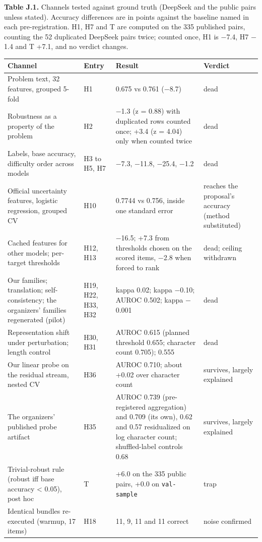 \begin{center}\begin{minipage}{\linewidth}
\noindent\textbf{Table J.1.} Channels tested against ground truth (DeepSeek and the public pairs unless stated). Accuracy differences are in points against the baseline named in each pre-registration. H1, H7 and T are computed on the 335 published pairs, counting the 52 duplicated DeepSeek pairs twice; counted once, H1 is $-$7.4, H7 $-$1.4 and T +7.1, and no verdict changes.\par\smallskip
{\footnotesize\setlength{\tabcolsep}{4pt}
\begin{tabular}{L{3.7cm}L{1.3cm}L{5.5cm}L{2.3cm}}
\toprule
\textbf{Channel} & \textbf{Entry} & \textbf{Result} & \textbf{Verdict} \\
\midrule
Problem text, 32 features, grouped 5-fold & H1 & 0.675 vs 0.761 ($-$8.7) & dead \\
Robustness as a property of the problem & H2 & $-$1.3 (z = 0.88) with duplicated rows counted once; +3.4 (z = 4.04) only when counted twice & dead \\
Labels, base accuracy, difficulty order across models & H3 to H5, H7 & $-$7.3, $-$11.8, $-$25.4, $-$1.2 & dead \\
Official uncertainty features, logistic regression, grouped CV & H10 & 0.7744 vs 0.756, inside one standard error & reaches the proposal's accuracy (method substituted) \\
Cached features for other models; per-target thresholds & H12, H13 & $-$16.5; +7.3 from thresholds chosen on the scored items, $-$2.8 when forced to rank & dead; ceiling withdrawn \\
Our families; translation; self-consistency; the organizers' families regenerated (pilot) & H19, H22, H33, H32 & kappa 0.02; kappa $-$0.10; AUROC 0.502; kappa $-$0.001 & dead \\
Representation shift under perturbation; length control & H30, H31 & AUROC 0.615 (planned threshold 0.655; character count 0.705); 0.555 & dead \\
Our linear probe on the residual stream, nested CV & H36 & AUROC 0.710; about +0.02 over character count & survives, largely explained \\
The organizers' published probe artifact & H35 & AUROC 0.739 (pre-registered aggregation) and 0.709 (its own), 0.62 and 0.57 residualized on log character count; shuffled-label controls 0.68 & survives, largely explained \\
Trivial-robust rule (robust iff base accuracy < 0.05), post hoc & T & +6.0 on the 335 public pairs, +0.0 on \texttt{val-sample} & trap \\
Identical bundles re-executed (warmup, 17 items) & H18 & 11, 9, 11 and 11 correct & noise confirmed \\
\bottomrule
\end{tabular}
}
\end{minipage}\end{center}

